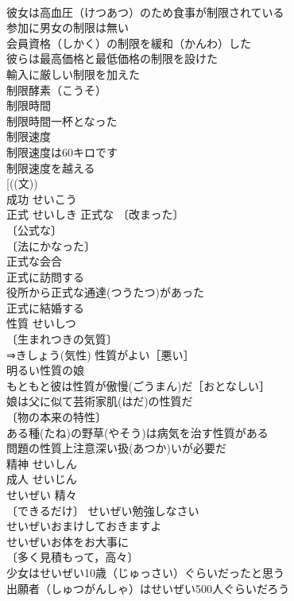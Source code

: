 \documentclass[8pt]{extreport}
\begin{document}
\begin{CJK}{UTF8}{min}
\\	彼女は高血圧（けつあつ）のため食事が制限されている 
\\	参加に男女の制限は無い 
\\	会員資格（しかく）の制限を緩和（かんわ）した 
\\	彼らは最高価格と最低価格の制限を設けた 
\\	輸入に厳しい制限を加えた 
\\	制限酵素（こうそ） 
\\	制限時間 
\\	制限時間一杯となった 
\\	制限速度 
\\	制限速度は60キロです 
\\	制限速度を越える 
\\	[((文)) 
\\	成功	せいこう	
\\	正式	せいしき	正式な 〔改まった〕
\\	〔公式な〕
\\	〔法にかなった〕
\\	正式な会合 
\\	正式に訪問する 
\\	役所から正式な通達(つうたつ)があった 
\\	正式に結婚する 
\\	性質	せいしつ	
\\	〔生まれつきの気質〕
\\	⇒きしょう(気性) 性質がよい［悪い］ 
\\	明るい性質の娘 
\\	もともと彼は性質が傲慢(ごうまん)だ［おとなしい］ 
\\	娘は父に似て芸術家肌(はだ)の性質だ 
\\	〔物の本来の特性〕
\\	ある種(たね)の野草(やそう)は病気を治す性質がある 
\\	問題の性質上注意深い扱(あつか)いが必要だ 
\\	精神	せいしん	
\\	成人	せいじん	
\\	せいぜい	精々	
\\	〔できるだけ〕 せいぜい勉強しなさい 
\\	せいぜいおまけしておきますよ 
\\	せいぜいお体をお大事に 
\\	〔多く見積もって，高々〕
\\	少女はせいぜい10歳（じゅっさい）ぐらいだったと思う 
\\	出願者（しゅつがんしゃ）はせいぜい500人ぐらいだろう 

\end{CJK}
\end{document}

